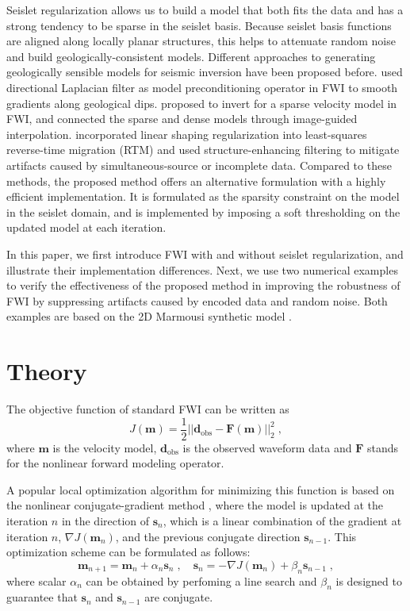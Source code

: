 Seislet regularization allows us to build a model that both fits the data and has a strong tendency to be sparse in the seislet basis. 
Because seislet basis functions are aligned along locally planar structures,
this helps to attenuate random noise and build geologically-consistent models.
Different approaches to generating geologically sensible models for seismic inversion have been proposed before.
\cite{guitton12} used directional Laplacian filter as model preconditioning operator in FWI to smooth gradients along geological dips.
\cite{ma12} proposed to invert for a sparse velocity model in FWI, and connected the sparse and dense models through image-guided interpolation. 
\cite{xue16} incorporated linear shaping regularization \cite[]{fomel07} into least-squares reverse-time migration (RTM) 
and used structure-enhancing filtering to mitigate artifacts caused by simultaneous-source or incomplete data.
Compared to these methods, the proposed method offers an alternative formulation with a highly efficient implementation.
It is formulated as the sparsity constraint on the model in the seislet domain, and is implemented by imposing a soft thresholding
on the updated model at each iteration.

In this paper, we first introduce FWI with and without seislet regularization, and illustrate their implementation differences.
Next, we use two numerical examples to verify the effectiveness of the proposed method in improving the robustness of FWI by suppressing artifacts
caused by encoded data and random noise.  
Both examples are based on the 2D Marmousi synthetic model \cite[]{bourgeois91}.

\section{Theory}
The objective function of standard FWI can be written as
\begin{equation}
J(\mathbf{m})=\frac{1}{2} ||\mathbf{d}_\text{obs}-\mathbf{F}(\mathbf{m})||_2^2 \; ,
\label{eq:obj}
\end{equation}
where $\mathbf{m}$ is the velocity model, $\mathbf{d}_\text{obs}$ is the observed waveform data and $\mathbf{F}$ stands for the nonlinear forward modeling operator.

A popular local optimization algorithm for minimizing this function is based on the nonlinear conjugate-gradient method \cite[]{mora87,tarantola87},
where the model is updated at the iteration $n$ in the direction of $\mathbf{s}_n$, which is 
a linear combination of the gradient at iteration $n$, $\nabla J(\mathbf{m}_n)$, and the previous conjugate direction $\mathbf{s}_{n-1}$.
This optimization scheme can be formulated as follows:
\begin{equation}
\mathbf{m}_{n+1}=\mathbf{m}_n + \alpha_n \mathbf{s}_n \; , \quad
\mathbf{s}_n=-\nabla J(\mathbf{m}_n)+ \beta_n \mathbf{s}_{n-1} \;,
\label{eq:opt}
\end{equation}
where scalar $\alpha_n$ can be obtained by perfoming a line search and $\beta_n$ is
designed to guarantee that $\mathbf{s}_n$ and $\mathbf{s}_{n-1}$ are conjugate.


